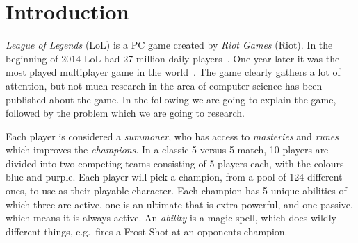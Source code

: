 \section{Introduction}\label{sec:intro}



\emph{League of Legends} (LoL) is a PC game created by \emph{Riot Games} (Riot). In the beginning of 2014 LoL had 27 million daily players~\cite{LoL27mill}. One year later it was the most played multiplayer game in the world~\cite{LoLmostplayed}. The game clearly gathers a lot of attention, but not much research in the area of computer science has been published about the game. In the following we are going to explain the game, followed by the problem which we are going to research. 

Each player is considered a \emph{summoner}, who has access to \emph{masteries} and \emph{runes} which improves the \emph{champions}. In a classic 5 versus 5 match, 10 players are divided into two competing teams consisting of 5 players each, with the colours blue and purple. Each player will pick a champion, from a pool of 124 different ones, to use as their playable character. Each champion has 5 unique abilities of which three are active, one is an ultimate that is extra powerful, and one passive, which means it is always active. An \emph{ability} is a magic spell, which does wildly different things, e.g.\ fires a Frost Shot at an opponents champion. 

